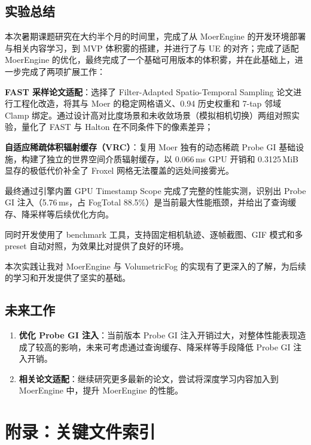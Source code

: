 \documentclass[11pt,a4paper]{article}
\begin{document}
\subsection{实验总结}

本次暑期课题研究在大约半个月的时间里，完成了从 MoerEngine 的开发环境部署与相关内容学习，到 MVP 体积雾的搭建，并进行了与 UE 的对齐；完成了适配 MoerEngine 的优化，最终完成了一个基础可用版本的体积雾，并在此基础上，进一步完成了两项扩展工作：

\textbf{FAST 采样论文适配}：选择了 Filter-Adapted Spatio-Temporal Sampling 论文进行工程化改造，将其与 Moer 的稳定网格语义、0.94 历史权重和 7-tap 邻域 Clamp 绑定。通过设计高对比度场景和未收敛场景（模拟相机切换）两组对照实验，量化了 FAST 与 Halton 在不同条件下的像素差异；

\textbf{自适应稀疏体积辐射缓存（VRC）}：复用 Moer 独有的动态稀疏 Probe GI 基础设施，构建了独立的世界空间介质辐射缓存，以 0.066\,ms GPU 开销和 0.3125\,MiB 显存的极低代价补全了 Froxel 网格无法覆盖的远处间接雾光。

最终通过引擎内置 GPU Timestamp Scope 完成了完整的性能实测，识别出 Probe GI 注入（5.76\,ms，占 FogTotal 88.5\%）是当前最大性能瓶颈，并给出了查询缓存、降采样等后续优化方向。

同时开发使用了 benchmark 工具，支持固定相机轨迹、逐帧截图、GIF 模式和多 preset 自动对照，为效果比对提供了良好的环境。

本次实践让我对 MoerEngine 与 VolumetricFog 的实现有了更深入的了解，为后续的学习和开发提供了坚实的基础。

\subsection{未来工作}

\begin{enumerate}[label=(\arabic*)]
    \item \textbf{优化 Probe GI 注入}：当前版本 Probe GI 注入开销过大，对整体性能表现造成了较高的影响，未来可考虑通过查询缓存、降采样等手段降低 Probe GI 注入开销。
    \item \textbf{相关论文适配}：继续研究更多最新的论文，尝试将深度学习内容加入到 MoerEngine 中，提升 MoerEngine 的性能。
\end{enumerate}

\section*{附录：关键文件索引}
\end{document}
